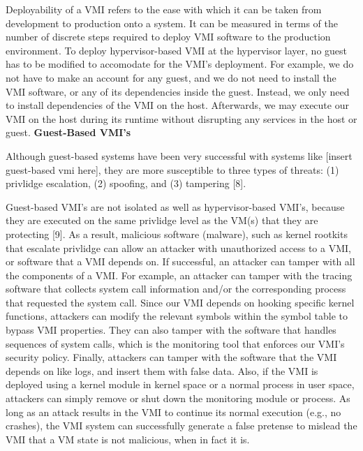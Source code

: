 \documentclass{report}
\begin{document}
\begin{spacing}{1.5}
{\large
Deployability of a VMI refers to the ease with which it can be taken from development to production onto a system. It can be measured in terms of the number of discrete steps required to deploy VMI software to the production environment. To deploy hypervisor-based VMI at the hypervisor layer, no guest has to be modified to accomodate for the VMI's deployment. For example, we do not have to make an account for any guest, and we do not need to install the VMI software, or any of its dependencies inside the guest. Instead, we only need to install dependencies of the VMI on the host. Afterwards, we may execute our VMI on the host during its runtime without disrupting any services in the host or guest.
\newline \newline
\textbf{Guest-Based VMI's}
\newline
}


{\large
Although guest-based systems have been very successful with systems like [insert guest-based vmi here], they are more susceptible to three types of threats: (1) privlidge escalation, (2) spoofing, and (3) tampering [8]. 
\newline
}

{\large
Guest-based VMI's are not isolated as well as hypervisor-based VMI's, because they are executed on the same privlidge level as the VM(s) that they are protecting [9]. As a result, malicious software (malware), such as kernel rootkits that escalate privlidge can allow an attacker with unauthorized access to a VMI, or software that a VMI depends on. If successful, an attacker can tamper with all the components of a VMI. For example, an attacker can tamper with the tracing software that collects system call information and/or the corresponding process that requested the system call. Since our VMI depends on hooking specific kernel functions, attackers can modify the relevant symbols within the symbol table to bypass VMI properties. They can also tamper with the software that handles sequences of system calls, which is the monitoring tool that enforces our VMI's security policy. Finally, attackers can tamper with the software that the VMI depends on like logs, and insert them with false data. Also, if the VMI is deployed using a kernel module in kernel space or a normal process in user space, attackers can simply remove or shut down the monitoring module or process. As long as an attack results in the VMI to continue its normal execution (e.g., no crashes), the VMI system can successfully generate a false pretense to mislead the VMI that a VM state is not malicious, when in fact it is.
\newline
}



\end{spacing}
\end{document}
